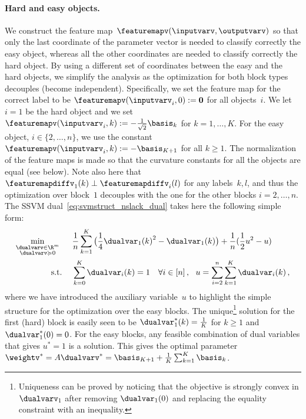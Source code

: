 \documentclass{article}
\begin{document}
\paragraph{Hard and easy objects.}
We construct the feature map~$\featuremapv(\inputvarv,\outputvarv)$ so that only the last coordinate of the parameter vector is needed to classify correctly the easy object, whereas all the other coordinates are needed to classify correctly the hard object. By using a different set of coordinates between the easy and the hard objects, we simplify the analysis as the optimization for both block types decouples (become independent).
Specifically, we set the feature map for the correct label to be $\featuremapv(\inputvarv_i,0):=\bm{0}$ for all objects~$i$. We let $i=1$ be the hard object and we set $\featuremapv(\inputvarv_i,k):={-\frac1{\sqrt{2}} \basis_{k}}$ for $k = 1,\dots,K$. For the easy object, $i\in \{2,\dots, n\}$, we use the constant $\featuremapv(\inputvarv_i,k) := {-\basis_{K+1}}$ for all $k\geq 1$.
The normalization of the feature maps is made so that the curvature constants for all the objects are equal (see below). Note also here that $\featuremapdiffv_1(k) \perp \featuremapdiffv_i(l)$ for any labels~$k, l$, and thus the optimization over block~$1$ decouples with the one for the other blocks $i = 2, \ldots, n$. The SSVM dual~\eqref{eq:svmstruct_nslack_dual} takes here the following simple form:
\begin{align}
    \label{eq:SSVMdualSimple}
    \min_{\substack{ \dualvarv\in\R^{m} \\  \dualvarv \succcurlyeq 0}} \quad  & \;\;
    \frac{1}{n} \sum_{k=1}^K \big(\frac{1}{4}{\dualvar_1(k)}^2 - \dualvar_1(k) \big) 
 	+ \frac{1}{n} (\frac{1}{2} u^2 - u ) \\
    \text{s.t.} ~~ & \;\; \sum_{k=0}^K  \dualvar_i(k) = 1 ~~~\forall i\in[n] \, , ~~  u = \sum_{i=2}^n \sum_{k=1}^K \dualvar_i(k)\, , \notag
\end{align}
where we have introduced the auxiliary variable~$u$ to highlight the simple structure for the optimization over the easy blocks. The unique\footnote{Uniqueness can be proved by noticing that the objective is strongly convex in $\dualvarv_1$ after removing $\dualvar_1(0)$ and replacing the equality constraint with an inequality.} solution for the first (hard) block is easily seen to be $\dualvar_1^*(k) = \frac{1}{K}$ for $k \geq 1$ and $\dualvar^*_1(0) = 0$. For the easy blocks, any feasible combination of dual variables that gives $u^* = 1$ is a solution. This gives the optimal parameter $\weightv^* = A \dualvarv^* = \basis_{K+1}+\frac{1}{K} \sum_{k=1}^K \basis_k$.
\end{document}
